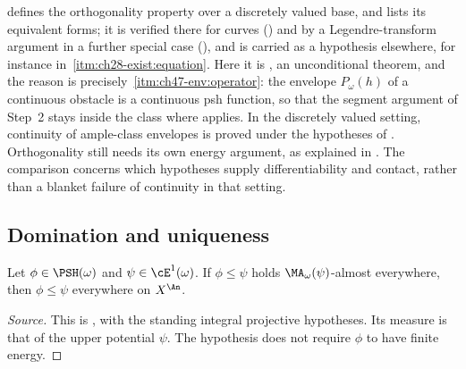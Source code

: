 \begin{remark}
\label{rem:ch47-orthogonality-status}
 defines the orthogonality property over a
discretely valued base, and 
lists its equivalent forms; it is verified there for curves
() and by a Legendre-transform argument
in a further special case (), and is
carried as a hypothesis elsewhere, for instance in
\,\cref{itm:ch28-exist:equation}.  Here
it is , an unconditional theorem,
and the reason is precisely
\,\cref{itm:ch47-env:operator}: the envelope
$P_\omega(h)$ of a continuous obstacle is a continuous psh function, so
that the segment argument of Step~2 stays inside the class where
 applies.  In the discretely valued setting, continuity of ample-class envelopes
is proved under the hypotheses of .
Orthogonality still needs its own energy argument, as explained in
. The comparison concerns which hypotheses
supply differentiability and contact, rather than a blanket failure of
continuity in that setting.
\end{remark}

\subsection{Domination and uniqueness}
\label{sec:ch47-domination}

\begin{theorem}
\label{thm:ch47-domination}

Let $\phi\in\PSH(\omega)$ and $\psi\in\cE^1(\omega)$. If
$\phi\le\psi$ holds $\MA_\omega(\psi)$-almost everywhere, then
$\phi\le\psi$ everywhere on $X^{\An}$.
\end{theorem}

\begin{proof}[Source]
This is \cite[Corollary~10.6]{BJ22}, with the standing integral projective
hypotheses. Its measure is that of the upper potential $\psi$.
The hypothesis does not require $\phi$ to have finite energy.
\end{proof}

